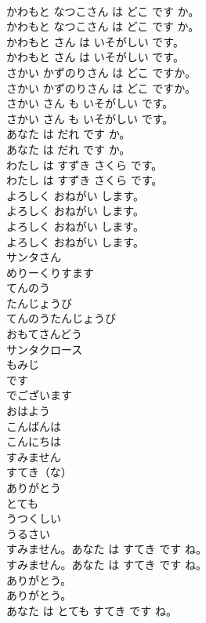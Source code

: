 \documentclass[8pt]{extreport}
\begin{document}
\begin{CJK}{UTF8}{min}
\\	かわもと なつこさん は どこ です か。	
\\	かわもと なつこさん は どこ です か。 
\\	かわもと さん は いそがしい です。	
\\	かわもと さん は いそがしい です。 
\\	さかい かずのりさん は どこ ですか。	
\\	さかい かずのりさん は どこ ですか。 
\\	さかい さん も いそがしい です。	
\\	さかい さん も いそがしい です。 
\\	あなた は だれ です か。	
\\	あなた は だれ です か。 
\\	わたし は すずき さくら です。	
\\	わたし は すずき さくら です。 
\\	よろしく おねがい します。	
\\	よろしく おねがい します。 
\\	よろしく おねがい します。	
\\	よろしく おねがい します。 
\\	サンタさん
\\	めりーくりすます
\\	てんのう
\\	たんじょうび
\\	てんのうたんじょうび
\\	おもてさんどう
\\	サンタクロース
\\	もみじ
\\	です
\\	でございます
\\	おはよう
\\	こんばんは
\\	こんにちは
\\	すみません
\\	すてき（な）
\\	ありがとう
\\	とても
\\	うつくしい
\\	うるさい
\\	すみません。あなた は すてき です ね。	
\\	すみません。あなた は すてき です ね。 
\\	ありがとう。	
\\	ありがとう。 
\\	あなた は とても すてき です ね。	

\end{CJK}
\end{document}
